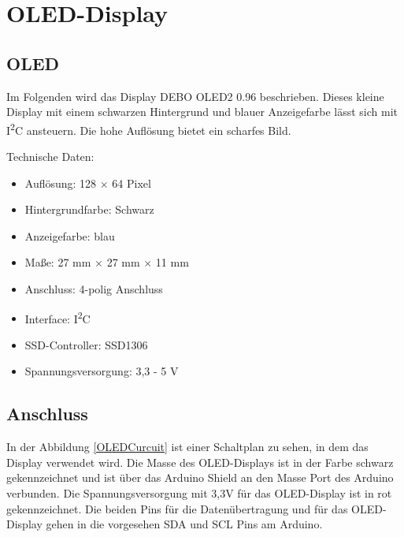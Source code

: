 %
%
%

\chapter{OLED-Display}




\section{OLED}

Im Folgenden wird das Display  DEBO OLED2 0.96 beschrieben. Dieses kleine Display mit einem schwarzen Hintergrund und blauer Anzeigefarbe lässt sich mit I\textsuperscript{2}C ansteuern. Die hohe Auflösung bietet ein scharfes Bild.\cite{Simac:2019}

\bigskip

Technische Daten:

\begin{itemize}
  \item Auflösung: 128 $\times$ 64 Pixel
  \item Hintergrundfarbe: Schwarz
  \item Anzeigefarbe: blau
  \item Maße: 27 mm $\times$  27 mm $\times$ 11 mm
  \item Anschluss: 4-polig Anschluss
  \item Interface: I\textsuperscript{2}C
  \item SSD-Controller: SSD1306
  \item Spannungsversorgung: 3,3 - 5 V
\end{itemize}


\section{Anschluss}

In der Abbildung \ref{OLEDCurcuit} ist einer Schaltplan  zu sehen, in dem das Display verwendet wird. Die Masse des OLED-Displays ist in der Farbe schwarz gekennzeichnet und ist  über das Arduino Shield an den Masse Port des Arduino verbunden. Die  Spannungsversorgung mit 3,3V für das OLED-Display ist in rot gekennzeichnet. Die beiden Pins für die Datenübertragung und für das OLED-Display gehen in die vorgesehen SDA und SCL Pins am Arduino.

